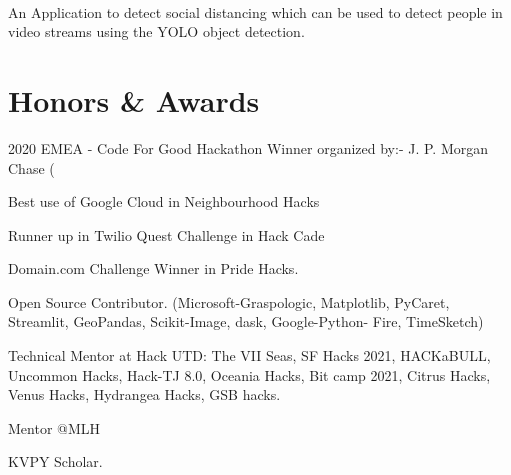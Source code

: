\documentclass[]{deedy-resume-openfont}
\begin{document}
      
          \hfill {}\\
          An Application to detect social distancing which can be used to detect people in video streams using
the YOLO object detection.\\
          \sectionsep
%
%
\section{Honors \& Awards}
\begin{tightemize}
\item 2020 EMEA - Code For Good Hackathon Winner organized by:- J. P. Morgan Chase (\\
\item Best use of Google Cloud in Neighbourhood Hacks\\
\item Runner up in Twilio Quest Challenge in Hack Cade\\
\item Domain.com Challenge Winner in Pride Hacks.\\
\item Open Source Contributor. (Microsoft-Graspologic, Matplotlib, PyCaret, Streamlit, GeoPandas, Scikit-Image, dask, Google-Python- Fire, TimeSketch)\\
\item Technical Mentor at Hack UTD: The VII Seas, SF Hacks 2021, HACKaBULL, Uncommon Hacks, Hack-TJ 8.0, Oceania Hacks, Bit camp 2021, Citrus Hacks, Venus Hacks, Hydrangea Hacks, GSB hacks.\\
\item Mentor @MLH\\
\item KVPY Scholar.\\
\end{tightemize}
    \ 
    
\end{document}
